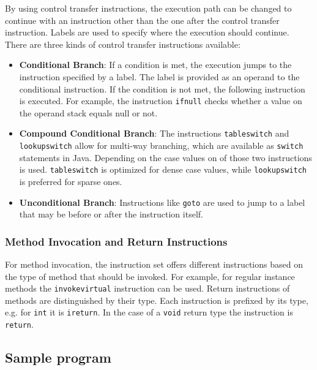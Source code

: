 By using control transfer instructions, the execution path can be changed to continue with an instruction other than the one after the control transfer instruction. Labels are used to specify where the execution should continue. There are three kinds of control transfer instructions available:

\begin{itemize}
    \item \textbf{Conditional Branch}: If a condition is met, the execution jumps to the instruction specified by a label. The label is provided as an operand to the conditional instruction. If the condition is not met, the following instruction is executed. For example, the instruction \texttt{ifnull} checks whether a value on the operand stack equals null or not.
    \item \textbf{Compound Conditional Branch}: The instructions \texttt{tableswitch} and \break \texttt{lookupswitch} allow for multi-way branching, which are available as \texttt{switch} statements in Java. Depending on the case values on of those two instructions is used. \texttt{tableswitch} is optimized for dense case values, while \texttt{lookupswitch} is preferred for sparse ones.
    \item \textbf{Unconditional Branch}: Instructions like \texttt{goto} are used to jump to a label that may be before or after the instruction itself. 
\end{itemize}

\subsubsection{Method Invocation and Return Instructions}

For method invocation, the instruction set offers different instructions based on the type of method that should be invoked. For example, for regular instance methods the \texttt{invokevirtual} instruction can be used. Return instructions of methods are distinguished by their type. Each instruction is prefixed by its type, e.g. for \texttt{int} it is \texttt{ireturn}. In the case of a \texttt{void} return type the instruction is \texttt{return}. 

\subsection{Sample program}